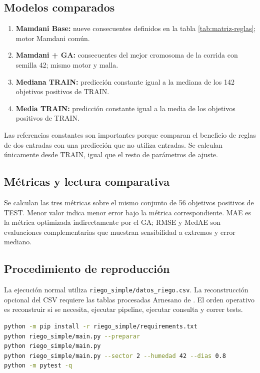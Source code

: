 \documentclass[11pt,letterpaper]{article}
\newcommand{\codigo}[1]{\texttt{\small #1}}
\begin{document}
\subsection{Modelos comparados}
\begin{enumerate}
  \item \textbf{Mamdani Base:} nueve consecuentes definidos en la tabla \ref{tab:matriz-reglas}; motor Mamdani común.
  \item \textbf{Mamdani + GA:} consecuentes del mejor cromosoma de la corrida con semilla 42; mismo motor y malla.
  \item \textbf{Mediana TRAIN:} predicción constante igual a la mediana de los 142 objetivos positivos de TRAIN.
  \item \textbf{Media TRAIN:} predicción constante igual a la media de los objetivos positivos de TRAIN.
\end{enumerate}
Las referencias constantes son importantes porque comparan el beneficio de reglas de dos entradas con una predicción que no utiliza entradas. Se calculan únicamente desde TRAIN, igual que el resto de parámetros de ajuste.

\subsection{Métricas y lectura comparativa}
Se calculan las tres métricas sobre el mismo conjunto de 56 objetivos positivos de TEST. Menor valor indica menor error bajo la métrica correspondiente. MAE es la métrica optimizada indirectamente por el GA; RMSE y MedAE son evaluaciones complementarias que muestran sensibilidad a extremos y error mediano.

\subsection{Procedimiento de reproducción}
La ejecución normal utiliza \codigo{riego\_simple/datos\_riego.csv}. La reconstrucción opcional del CSV requiere las tablas procesadas Arnesano de . El orden operativo es reconstruir si se necesita, ejecutar pipeline, ejecutar consulta y correr tests.

\begin{lstlisting}[language=bash,caption={Comandos de reproducción desde la raíz del repositorio}]
python -m pip install -r riego_simple/requirements.txt
python riego_simple/main.py --preparar
python riego_simple/main.py
python riego_simple/main.py --sector 2 --humedad 42 --dias 0.8
python -m pytest -q
\end{lstlisting}
\end{document}
